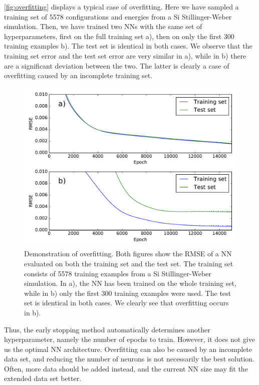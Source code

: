 \documentclass[twoside,english]{uiofysmaster}
\begin{document}
\autoref{fig:overfitting} displays a typical case of overfitting. Here we have sampled a training set 
of 5578 configurations and energies from a Si Stillinger-Weber simulation. Then, we have trained two NNs 
with the same set of hyperparameters, first on the full training set a), then on only the first 300 training examples b).
The test set is identical in both cases. We observe that the training set error and the test set 
error are very similar in a), while in b) there are a significant deviation between the two. The latter is clearly a case 
of overfitting caused by an incomplete training set.  
\begin{figure}
\centering
  \includegraphics[width = 0.8\linewidth]{Figures/Implementation/overfitting.pdf}
  \caption{Demonstration of overfitting. Both figures show the RMSE of a NN evaluated on both the training set and 
	   the test set. The training set consists of 5578 training examples from a Si Stillinger-Weber simulation.
	   In a), the NN has been trained on 
	   the whole training set, while in b) only the first 300 training examples were used. The test set is 
	   identical in both cases. We clearly see that overfitting occurs in b).}
  \label{fig:overfitting}
\end{figure}

Thus, the early stopping method automatically determines another hyperparameter, namely the number of epochs to train. 
However, it does not give us the optimal NN architecture. Overfitting can also be caused by an incomplete data set, 
and reducing the number of neurons is not necessarily the best solution. Often, more data should be added instead, 
and the current NN size may fit the extended data set better. 
\end{document}

